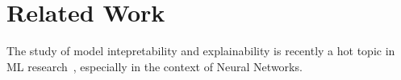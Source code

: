 \section{Related Work}
The study of model intepretability and explainability is recently a hot topic in ML research~\cite{taylor2016alignment, lei2016rationalizing, ribeiro2016should}, especially in the context of Neural Networks. 